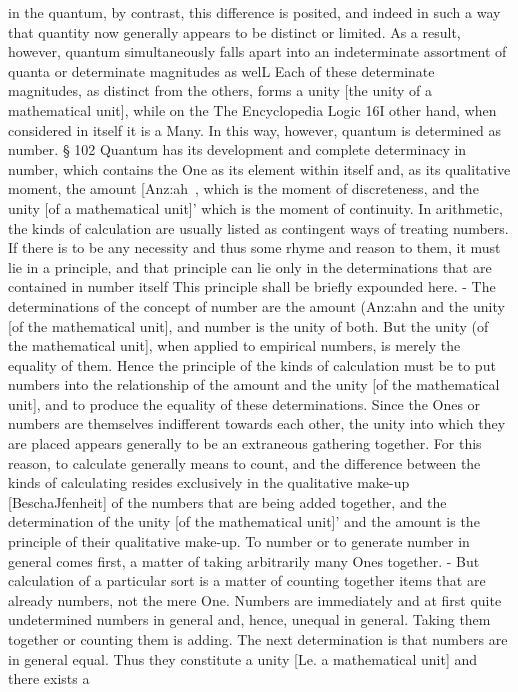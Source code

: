 {{in the quantum, by contrast, this difference is posited, and indeed in such a way
that quantity now generally appears to be distinct or limited. As a result, however,
quantum simultaneously falls apart into an indeterminate assortment of quanta or
determinate magnitudes as welL Each of these determinate magnitudes, as distinct
from the others, forms a unity [the unity of a mathematical unit], while on the
The Encyclopedia Logic
16I
other hand, when considered in itself it is a Many. In this way, however, quantum
is determined as number.
§ 102
Quantum has its development and complete determinacy in number, which
contains the One as its element within itself and, as its qualitative moment,
the amount [Anz:ah~, which is the moment of discreteness, and the unity
[of a mathematical unit]' which is the moment of continuity.
In arithmetic, the kinds of calculation are usually listed as contingent
ways of treating numbers. If there is to be any necessity and thus
some rhyme and reason to them, it must lie in a principle, and that
principle can lie only in the determinations that are contained in
number itself This principle shall be briefly expounded here. - The
determinations of the concept of number are the amount (Anz:ahn
and the unity [of the mathematical unit], and number is the unity
of both. But the unity (of the mathematical unit], when applied
to empirical numbers, is merely the equality of them. Hence the
principle of the kinds of calculation must be to put numbers into
the relationship of the amount and the unity [of the mathematical
unit], and to produce the equality of these determinations.
Since the Ones or numbers are themselves indifferent towards
each other, the unity into which they are placed appears generally
to be an extraneous gathering together. For this reason, to calculate
generally means to count, and the difference between the kinds
of calculating resides exclusively in the qualitative make-up
[BeschaJfenheit] of the numbers that are being added together, and
the determination of the unity [of the mathematical unit]' and the
amount is the principle of their qualitative make-up.
To number or to generate number in general comes first, a matter
of taking arbitrarily many Ones together. - But calculation of a
particular sort is a matter of counting together items that are already
numbers, not the mere One.
Numbers are immediately and at first quite undetermined
numbers in general and, hence, unequal in general. Taking them
together or counting them is adding.
The next determination is that numbers are in general equal. Thus
they constitute a unity [Le. a mathematical unit] and there exists a
}}
